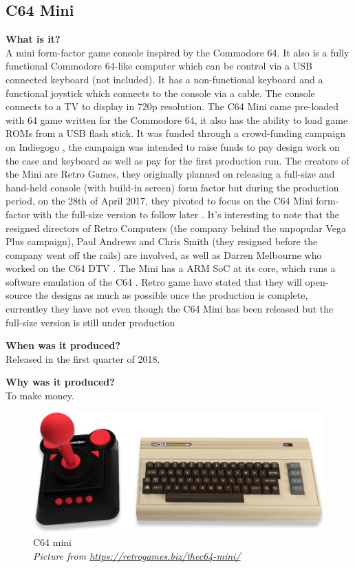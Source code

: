 \subsection{C64 Mini}
\textbf{What is it?}\\
A mini form-factor game console inspired by the Commodore 64. It also is a fully functional Commodore 64-like computer which can be control via a USB connected keyboard (not included). It has a non-functional keyboard and a functional joystick which connects to the console via a cable. The console connects to a TV to display in 720p resolution. The C64 Mini came pre-loaded with 64 game written for the Commodore 64, it also has the ability to load game ROMs from a USB flash stick. It was funded through a crowd-funding campaign on Indiegogo 
\cite{RN124}, the campaign was intended to raise funds to pay design work on the case and keyboard as well as pay for the first production run. The creators of the Mini are Retro Games, they originally planned on releasing a full-size and hand-held console (with build-in screen) form factor but during the production period, on the 28th of April 2017, they pivoted to focus on the C64 Mini form-factor with the full-size version to follow later \cite{RN160}. It's interesting to note that the resigned directors of Retro Computers (the company behind the unpopular Vega Plus campaign), Paul Andrews and Chris Smith (they resigned before the company went off the rails) are involved, as well as Darren Melbourne who worked on the C64 DTV 
\cite{RN127}. The Mini has a ARM SoC at its core, which runs a software emulation of the C64 
\cite{RN160}. Retro game have stated that they will open-source the designs as much as possible once the production is complete, currentley they have not even though the C64 Mini has been released but the full-size version is still under production

\textbf{When was it produced?}\\
Released in the first quarter of 2018.

\textbf{Why was it produced?}\\
To make money.

\begin{figure} \begin{center}
\includegraphics[width=.3\linewidth]{pics/C64_mini} 
\end{center} 
\caption{C64 mini\\ \textit{\small{Picture from \url {https://retrogames.biz/thec64-mini/}}}}
\label{C64_mini}
\end{figure}

